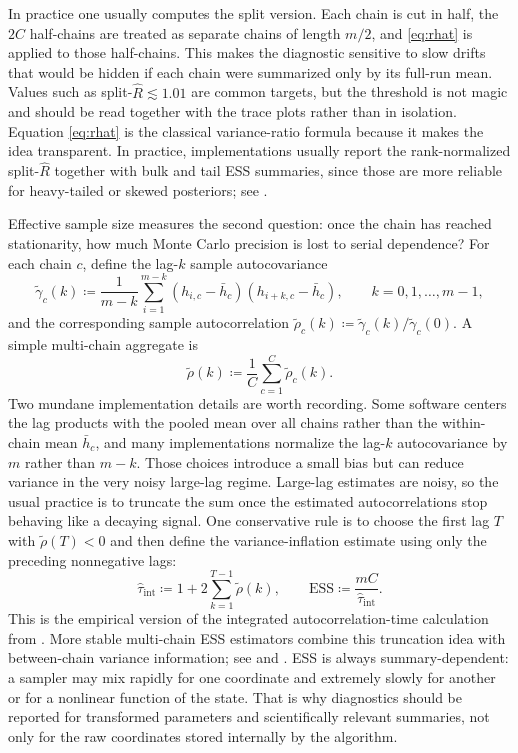 In practice one usually computes the split version.
Each chain is cut in half, the $2C$ half-chains are treated as separate chains of length $m/2$, and \eqref{eq:rhat} is applied to those half-chains.
This makes the diagnostic sensitive to slow drifts that would be hidden if each chain were summarized only by its full-run mean.
Values such as split-$\hat R\lesssim 1.01$ are common targets, but the threshold is not magic and should be read together with the trace plots rather than in isolation.
Equation \eqref{eq:rhat} is the classical variance-ratio formula because it makes the idea transparent.
In practice, implementations usually report the rank-normalized split-$\hat R$ together with bulk and tail ESS summaries, since those are more reliable for heavy-tailed or skewed posteriors; see \citet[\S\S4.1--4.5]{vehtari_gelman_simpson_carpenter_burkner_2021_rank_normalization}.

Effective sample size measures the second question: once the chain has reached stationarity, how much Monte Carlo precision is lost to serial dependence?
For each chain $c$, define the lag-$k$ sample autocovariance
\[
  \tilde\gamma_c(k)
  \coloneqq
  \frac{1}{m-k}\sum_{i=1}^{m-k}(h_{i,c}-\bar h_c)(h_{i+k,c}-\bar h_c),
  \qquad
  k=0,1,\dots,m-1,
\]
and the corresponding sample autocorrelation $\tilde\rho_c(k)\coloneqq \tilde\gamma_c(k)/\tilde\gamma_c(0)$.
A simple multi-chain aggregate is
\[
  \tilde\rho(k)\coloneqq \frac{1}{C}\sum_{c=1}^C \tilde\rho_c(k).
\]
Two mundane implementation details are worth recording.
Some software centers the lag products with the pooled mean over all chains rather than the within-chain mean \(\bar h_c\), and many implementations normalize the lag-\(k\) autocovariance by \(m\) rather than \(m-k\).
Those choices introduce a small bias but can reduce variance in the very noisy large-lag regime.
Large-lag estimates are noisy, so the usual practice is to truncate the sum once the estimated autocorrelations stop behaving like a decaying signal.
One conservative rule is to choose the first lag $T$ with $\tilde\rho(T)<0$ and then define the variance-inflation estimate using only the preceding nonnegative lags:
\begin{equation}
  \hat\tau_{\mathrm{int}}
  \coloneqq
  1+2\sum_{k=1}^{T-1}\tilde\rho(k),
  \qquad
  \mathrm{ESS}
  \coloneqq
  \frac{mC}{\hat\tau_{\mathrm{int}}}.
  \label{eq:ess-estimate}
\end{equation}
This is the empirical version of the integrated autocorrelation-time calculation from .
More stable multi-chain ESS estimators combine this truncation idea with between-chain variance information; see \citet[App.~A]{hoffman_gelman_2014_nuts} and \citet[\S3.2]{vehtari_gelman_simpson_carpenter_burkner_2021_rank_normalization}.
ESS is always summary-dependent: a sampler may mix rapidly for one coordinate and extremely slowly for another or for a nonlinear function of the state.
That is why diagnostics should be reported for transformed parameters and scientifically relevant summaries, not only for the raw coordinates stored internally by the algorithm.
